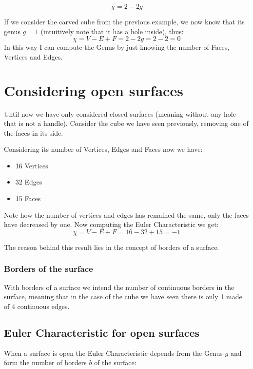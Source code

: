 \begin{equation*}
    \chi = 2 - 2g
\end{equation*}

If we consider the carved cube from the previous example, we now know that its genus $g = 1$ (intuitively note that it has a hole inside), thus:
\begin{equation*}
    \chi = V - E + F = 2 - 2g = 2 - 2 = 0
\end{equation*} 
In this way I can compute the Genus by just knowing the number of Faces, Vertices and Edges.

\section{Considering open surfaces}
Until now we have only considered closed surfaces (meaning without any hole that is not a handle). Consider the cube we have seen previously, removing one of the faces in its side.


Considering its number of Vertices, Edges and Faces now we have:
\begin{itemize}
    \item 16 Vertices
    \item 32 Edges
    \item 15 Faces
\end{itemize}
Note how the number of vertices and edges has remained the same, only the faces have decreased by one. Now computing the Euler Characteristic we get:
\begin{equation*}
    \chi = V - E + F = 16 - 32 + 15 = -1
\end{equation*}

The reason behind this result lies in the concept of borders of a surface.

\subsubsection{Borders of the surface}
With borders of a surface we intend the number of continuous borders in the surface, meaning that in the case of the cube we have seen there is only 1 made of 4 continuous edges.

\subsection{Euler Characteristic for open surfaces}
When a surface is open the Euler Characteristic depends from the Genus $g$ and form the number of borders $b$ of the surface:

